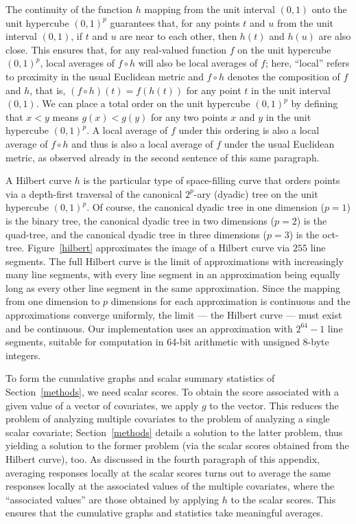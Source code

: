 \documentclass{article}
\begin{document}
The continuity of the function $h$ mapping from the unit interval $(0, 1)$
onto the unit hypercube $(0, 1)^p$ guarantees that,
for any points $t$ and $u$ from the unit interval $(0, 1)$,
if $t$ and $u$ are near to each other, then $h(t)$ and $h(u)$ are also close.
This ensures that, for any real-valued function $f$
on the unit hypercube $(0, 1)^p$,
local averages of $f \circ h$ will also be local averages of $f$;
here, ``local'' refers to proximity in the usual Euclidean metric
and $f \circ h$ denotes the composition of $f$ and $h$, that is,
$(f \circ h)(t) = f(h(t))$ for any point $t$ in the unit interval $(0, 1)$.
We can place a total order on the unit hypercube $(0, 1)^p$ by defining
that $x < y$ means $g(x) < g(y)$
for any two points $x$ and $y$ in the unit hypercube $(0, 1)^p$.
A local average of $f$ under this ordering
is also a local average of $f \circ h$ and thus is also a local average of $f$
under the usual Euclidean metric, as observed already
in the second sentence of this same paragraph.

A Hilbert curve $h$ is the particular type of space-filling curve
that orders points via a depth-first traversal
of the canonical $2^p$-ary (dyadic) tree on the unit hypercube $(0, 1)^p$.
Of course, the canonical dyadic tree in one dimension ($p = 1$)
is the binary tree, the canonical dyadic tree in two dimensions ($p = 2$)
is the quad-tree, and the canonical dyadic tree in three dimensions ($p = 3$)
is the oct-tree.
Figure~\ref{hilbert} approximates the image of a Hilbert curve
via $255$ line segments.
The full Hilbert curve is the limit of approximations
with increasingly many line segments, with every line segment
in an approximation being equally long as every other line segment
in the same approximation. Since the mapping from one dimension
to $p$ dimensions for each approximation is continuous
and the approximations converge uniformly, the limit --- the Hilbert curve ---
must exist and be continuous.
Our implementation uses an approximation with $2^{64} - 1$ line segments,
suitable for computation in 64-bit arithmetic with unsigned 8-byte integers.

To form the cumulative graphs and scalar summary statistics
of Section~\ref{methods}, we need scalar scores.
To obtain the score associated with a given value of a vector of covariates,
we apply $g$ to the vector.
This reduces the problem of analyzing multiple covariates
to the problem of analyzing a single scalar covariate;
Section~\ref{methods} details a solution to the latter problem,
thus yielding a solution to the former problem (via the scalar scores
obtained from the Hilbert curve), too.
As discussed in the fourth paragraph of this appendix,
averaging responses locally at the scalar scores turns out
to average the same responses locally at the associated values
of the multiple covariates, where the ``associated values'' are those obtained
by applying $h$ to the scalar scores.
This ensures that the cumulative graphs and statistics
take meaningful averages.
\end{document}
